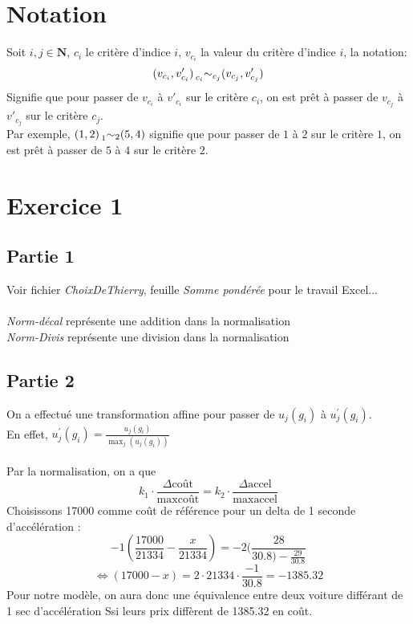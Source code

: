 \documentclass[a4paper, 12pt]{article}
\newcommand*{\indif}{\sim}
\newcommand*{\indifchange}[2]{\prescript{}{#1}{\indif}_{#2}}
\begin{document}
	\section*{Notation}
	Soit $i,j \in \mathbf{N}$, $c_i$ le critère d'indice $i$, $v_{c_i}$ la valeur du critère d'indice $i$,
	la notation:
	$$(v_{c_i},v'_{c_i})\indifchange{c_i}{c_j}(v_{c_j},v'_{c_j})$$
	Signifie que pour passer de $v_{c_i}$ à $v'_{c_i}$ sur le critère $c_i$, on est prêt à passer de
	$v_{c_j}$ à $v'_{c_j}$ sur le critère $c_j$.\\
	
	Par exemple, $(1,2)\indifchange{1}{2}(5,4)$ signifie que pour passer de $1$ à $2$ sur
	le critère $1$, on est prêt à passer de $5$ à $4$ sur le critère $2$.
	\section*{Exercice 1}
		\subsection*{Partie 1}
			Voir fichier \textit{ChoixDeThierry}, feuille 
			\textit{Somme pondérée} pour le travail Excel...\\
			~\\
			\textit{Norm-décal} représente une addition dans la
			 normalisation\\
			\textit{Norm-Divis} représente une division dans la 
			 normalisation
		\subsection*{Partie 2}
			On a effectué une transformation affine pour passer de
			$u_j(g_i)$ à $u^{'}_{j}(g_i)$. \\
			En effet,  $u^{'}_{j}(g_i) = 
			\frac{u_j(g_i)}{\max_j (u_j(g_i))}$\\
			~\\
			Par la normalisation, on a que 
			$$ k_1 \cdot \frac{\Delta \text{coût}}{\max \text{coût}} 
			 = k_2 \cdot \frac{\Delta \text{accel}}{\max \text{accel}}$$
			Choisissons 17000 comme coût de référence pour un delta de 1
			seconde d'accélération : 
			$$ -1 (\frac{17000}{21334} - \frac{x}{21334})
			 = -2 (\frac{28}{30.8) - \frac{29}{30.8}} $$
			$$ \Leftrightarrow 
			   (17000 - x) = 2 \cdot 21334 \cdot \frac{-1}{30.8} 
			 = -1385.32 $$
			Pour notre modèle, on aura donc une équivalence entre deux
			voiture différant de 1 sec d'accélération Ssi leurs prix 
			diffèrent de 1385.32 en coût.
\end{document}
